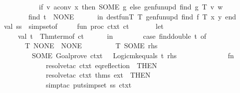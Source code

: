\begin{isabellebody}
\ \ \ \ \ \ \ \ \ \ \ \ \ \ if\ v\ aconv\ x\ then\ SOME\ g\ else\ gen{\isacharunderscore}{\kern0pt}fun{\isacharunderscore}{\kern0pt}upd\ {\isacharparenleft}{\kern0pt}find\ g{\isacharparenright}{\kern0pt}\ T\ v\ w\isanewline
\ \ \ \ \ \ \ \ \ \ {\isacharbar}{\kern0pt}\ find\ t\ {\isacharequal}{\kern0pt}\ NONE\isanewline
\ \ \ \ \ \ in\ {\isacharparenleft}{\kern0pt}dest{\isacharunderscore}{\kern0pt}fun{\isacharunderscore}{\kern0pt}T{}\ T{\isacharcomma}{\kern0pt}\ gen{\isacharunderscore}{\kern0pt}fun{\isacharunderscore}{\kern0pt}upd\ {\isacharparenleft}{\kern0pt}find\ f{\isacharparenright}{\kern0pt}\ T\ x\ y{\isacharparenright}{\kern0pt}\ end\isanewline
\isanewline
\ \ \ \ val\ ss\ {\isacharequal}{\kern0pt}\ simpset{\isacharunderscore}{\kern0pt}of\ \isactrlcontext \isanewline
\isanewline
\ \ \ \ fun\ proc\ ctxt\ ct\ {\isacharequal}{\kern0pt}\isanewline
\ \ \ \ \ \ let\isanewline
\ \ \ \ \ \ \ \ val\ t\ {\isacharequal}{\kern0pt}\ Thm{\isachardot}{\kern0pt}term{\isacharunderscore}{\kern0pt}of\ ct\isanewline
\ \ \ \ \ \ in\isanewline
\ \ \ \ \ \ \ \ {\isacharparenleft}{\kern0pt}case\ find{\isacharunderscore}{\kern0pt}double\ t\ of\isanewline
\ \ \ \ \ \ \ \ \ \ {\isacharparenleft}{\kern0pt}T{\isacharcomma}{\kern0pt}\ NONE{\isacharparenright}{\kern0pt}\ {\isacharequal}{\kern0pt}{\isachargreater}{\kern0pt}\ NONE\isanewline
\ \ \ \ \ \ \ \ {\isacharbar}{\kern0pt}\ {\isacharparenleft}{\kern0pt}T{\isacharcomma}{\kern0pt}\ SOME\ rhs{\isacharparenright}{\kern0pt}\ {\isacharequal}{\kern0pt}{\isachargreater}{\kern0pt}\isanewline
\ \ \ \ \ \ \ \ \ \ \ \ SOME\ {\isacharparenleft}{\kern0pt}Goal{\isachardot}{\kern0pt}prove\ ctxt\ {\isacharbrackleft}{\kern0pt}{\isacharbrackright}{\kern0pt}\ {\isacharbrackleft}{\kern0pt}{\isacharbrackright}{\kern0pt}\ {\isacharparenleft}{\kern0pt}Logic{\isachardot}{\kern0pt}mk{\isacharunderscore}{\kern0pt}equals\ {\isacharparenleft}{\kern0pt}t{\isacharcomma}{\kern0pt}\ rhs{\isacharparenright}{\kern0pt}{\isacharparenright}{\kern0pt}\isanewline
\ \ \ \ \ \ \ \ \ \ \ \ \ \ {\isacharparenleft}{\kern0pt}fn\ {\isacharunderscore}{\kern0pt}\ {\isacharequal}{\kern0pt}{\isachargreater}{\kern0pt}\isanewline
\ \ \ \ \ \ \ \ \ \ \ \ \ \ \ \ resolve{\isacharunderscore}{\kern0pt}tac\ ctxt\ {\isacharbrackleft}{\kern0pt}eq{\isacharunderscore}{\kern0pt}reflection{\isacharbrackright}{\kern0pt}\ {}\ THEN\isanewline
\ \ \ \ \ \ \ \ \ \ \ \ \ \ \ \ resolve{\isacharunderscore}{\kern0pt}tac\ ctxt\ {\isacharat}{\kern0pt}{\isacharbraceleft}{\kern0pt}thms\ ext{\isacharbraceright}{\kern0pt}\ {}\ THEN\isanewline
\ \ \ \ \ \ \ \ \ \ \ \ \ \ \ \ simp{\isacharunderscore}{\kern0pt}tac\ {\isacharparenleft}{\kern0pt}put{\isacharunderscore}{\kern0pt}simpset\ ss\ ctxt{\isacharparenright}{\kern0pt}\ {}{\isacharparenright}{\kern0pt}{\isacharparenright}{\kern0pt}{\isacharparenright}{\kern0pt}\isanewline

\end{isabellebody}
